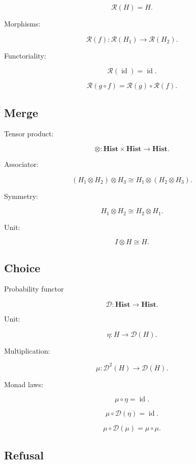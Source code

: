\documentclass[12pt,oneside]{article}
\theoremstyle{definition}
\theoremstyle{remark}
\begin{document}
\[
\mathcal R(H)
=
H.
\]

Morphisms:

\[
\mathcal R(f)
:
\mathcal R(H_1)
\rightarrow
\mathcal R(H_2).
\]

Functoriality:

\[
\mathcal R(\operatorname{id})
=
\operatorname{id}.
\]

\[
\mathcal R(g\circ f)
=
\mathcal R(g)
\circ
\mathcal R(f).
\]

\subsection*{Merge}

Tensor product:

\[
\otimes
:
\mathbf{Hist}
\times
\mathbf{Hist}
\rightarrow
\mathbf{Hist}.
\]

Associator:

\[
(H_1\otimes H_2)\otimes H_3
\cong
H_1\otimes(H_2\otimes H_3).
\]

Symmetry:

\[
H_1\otimes H_2
\cong
H_2\otimes H_1.
\]

Unit:

\[
I\otimes H
\cong
H.
\]

\subsection*{Choice}

Probability functor

\[
\mathcal D
:
\mathbf{Hist}
\rightarrow
\mathbf{Hist}.
\]

Unit:

\[
\eta
:
H
\rightarrow
\mathcal D(H).
\]

Multiplication:

\[
\mu
:
\mathcal D^2(H)
\rightarrow
\mathcal D(H).
\]

Monad laws:

\[
\mu
\circ
\eta
=
\operatorname{id}.
\]

\[
\mu
\circ
\mathcal D(\eta)
=
\operatorname{id}.
\]

\[
\mu
\circ
\mathcal D(\mu)
=
\mu
\circ
\mu.
\]

\subsection*{Refusal}
\end{document}
